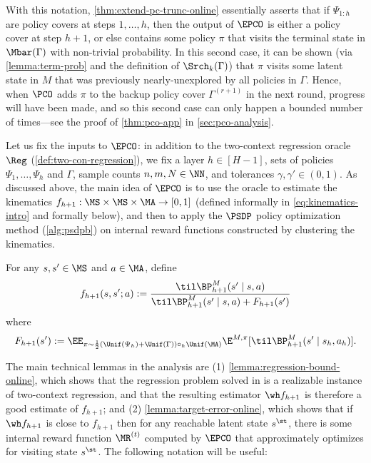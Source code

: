 With this notation, \cref{thm:extend-pc-trunc-online} essentially asserts that if $\Psi_{1:h}$ are policy covers at steps $1,\dots,h$, then the output of $\EPCO$ is either a policy cover at step $h+1$, or else contains some policy $\pi$ that visits the terminal state in $\Mbar(\Gamma)$ with non-trivial probability. In this second case, it can be shown (via \cref{lemma:term-prob} and the definition of $\Srch_k(\Gamma)$) that $\pi$ visits some latent state in $M$ that was previously nearly-unexplored by all policies in $\Gamma$. Hence, when $\PCO$ adds $\pi$ to the backup policy cover $\Gamma^{(r+1)}$ in the next round, progress will have been made, and so this second case can only happen a bounded number of times---see the proof of \cref{thm:pco-app} in \cref{sec:pco-analysis}.


Let us fix the inputs to $\EPCO$: in addition to the two-context regression oracle $\Reg$ (\cref{def:two-con-regression}), we fix a layer $h \in [H-1]$, sets of policies $\Psi_1,\dots,\Psi_h$ and $\Gamma$, sample counts $n,m,N \in \NN$, and tolerances $\gamma,\gamma' \in (0,1)$. As discussed above, the main idea of $\EPCO$ is to use the oracle to estimate the kinematics $f_{h+1}: \MS\times\MS\times\MA \to [0,1]$ (defined informally in \cref{eq:kinematics-intro} and formally below), and then to apply the $\PSDP$ policy optimization method (\cref{alg:psdpb}) on internal reward functions constructed by clustering the kinematics.

\begin{definition}\label{def:kinematics}
For any $s,s' \in \MS$ and $a \in \MA$, define 
\[f_{h+1}(s,s';a) := \frac{\til\BP^M_{h+1}(s'\mid{}s,a)}{\til\BP^M_{h+1}(s'\mid{}s,a) + F_{h+1}(s')}\]
where 
\[F_{h+1}(s') := \EE_{\pi \sim \frac{1}{2}(\Unif(\Psi_h)+\Unif(\Gamma))\circ_h\Unif(\MA)} \E^{M,\pi}[\til\BP^M_{h+1}(s'\mid{}s_h,a_h)].\] 
\end{definition}

The main technical lemmas in the analysis are (1) \cref{lemma:regression-bound-online}, which shows that the regression problem solved in  is a realizable instance of two-context regression, and that the resulting estimator $\wh f_{h+1}$ is therefore a good estimate of $f_{h+1}$; and (2) \cref{lemma:target-error-online}, which shows that if $\wh f_{h+1}$ is close to $f_{h+1}$ then for any reachable latent state $s^\st$, there is some internal reward function $\MR^{(t)}$ computed by $\EPCO$ that approximately optimizes for visiting state $s^\st$. The following notation will be useful: 

